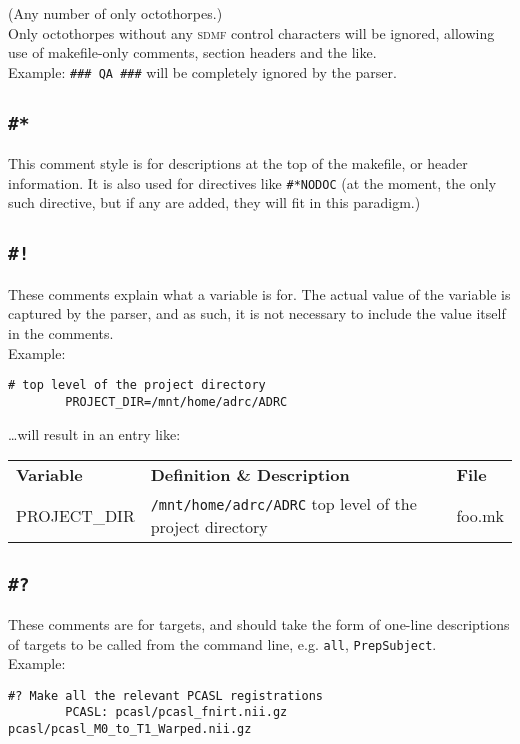 \documentclass[oneside,11pt]{article}
\newcommand{\sdmf}{\textsc{sdmf}}
\begin{document}
	(Any number of only octothorpes.) \\ Only octothorpes without any \sdmf{} control characters will be ignored, allowing use of  makefile-only comments, section headers and the like. \\ Example: \texttt{\#\#\# QA \#\#\#} will be completely ignored by the parser.
	
	\subsection{\texttt{\#*}}
	
	This comment style is for descriptions at the top of the makefile, or header information. It is also used for directives like \texttt{\#*NODOC} (at the moment, the only such directive, but if any are added, they will fit in this paradigm.)
	
	\subsection{\texttt{\#!}}
	
	These comments explain what a variable is for. The actual value of the variable is captured by the parser, and as such, it is not necessary to include the value itself in the comments. \\
	Example: 
	\begin{lstlisting}[gobble=16, basicstyle=\ttfamily]
		# top level of the project directory
		PROJECT_DIR=/mnt/home/adrc/ADRC 
	\end{lstlisting}
	
	\ldots will result in an entry like: \\
	
	\begin{tabularx}{\textwidth}{>{\ttfamily}l X >{\ttfamily}l}
		\rowcolor{gray!50}
		\textbf{Variable} & \textbf{Definition \& Description} & \textbf{File} \\
		PROJECT\_DIR	& \texttt{/mnt/home/adrc/ADRC} \newline top level of the project directory & foo.mk \\
		\bottomrule
	\end{tabularx}
	
	\subsection{\texttt{\#?}}
	
	These comments are for targets, and should take the form of one-line descriptions of targets to be called from the command line, e.g. \texttt{all}, \texttt{PrepSubject}. \\
	Example:
	\begin{lstlisting}[basicstyle=\ttfamily,gobble=16, breaklines=true]
		#? Make all the relevant PCASL registrations
		PCASL: pcasl/pcasl_fnirt.nii.gz pcasl/pcasl_M0_to_T1_Warped.nii.gz	
	\end{lstlisting} 
	
\end{document}
